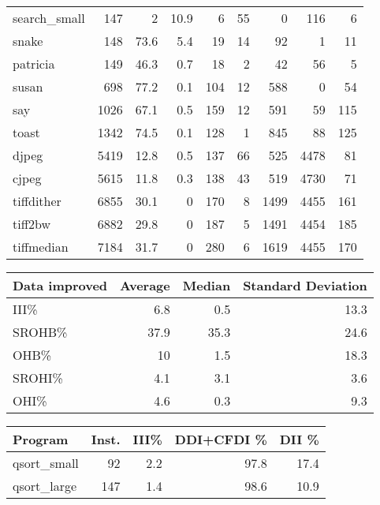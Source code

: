 \begin{tabular}{lrrrrrrrr}
 search\_small    &      147 &      2   &   10.9 &    6 &   55 &      0 &   116 &     6 \\
 snake           &      148 &     73.6 &    5.4 &   19 &   14 &     92 &     1 &    11 \\
 patricia        &      149 &     46.3 &    0.7 &   18 &    2 &     42 &    56 &     5 \\
 susan           &      698 &     77.2 &    0.1 &  104 &   12 &    588 &     0 &    54 \\
 say             &     1026 &     67.1 &    0.5 &  159 &   12 &    591 &    59 &   115 \\
 toast           &     1342 &     74.5 &    0.1 &  128 &    1 &    845 &    88 &   125 \\
 djpeg           &     5419 &     12.8 &    0.5 &  137 &   66 &    525 &  4478 &    81 \\
 cjpeg           &     5615 &     11.8 &    0.3 &  138 &   43 &    519 &  4730 &    71 \\
 tiffdither      &     6855 &     30.1 &    0   &  170 &    8 &   1499 &  4455 &   161 \\
 tiff2bw         &     6882 &     29.8 &    0   &  187 &    5 &   1491 &  4454 &   185 \\
 tiffmedian      &     7184 &     31.7 &    0   &  280 &    6 &   1619 &  4455 &   170 \\
\hline
\end{tabular}\begin{tabular}{lrrr}
\hline
 Data improved   &   Average &   Median &   Standard Deviation \\
\hline
 III\%            &       6.8 &      0.5 &                 13.3 \\
 SROHB\%          &      37.9 &     35.3 &                 24.6 \\
 OHB\%            &      10   &      1.5 &                 18.3 \\
 SROHI\%          &       4.1 &      3.1 &                  3.6 \\
 OHI\%            &       4.6 &      0.3 &                  9.3 \\
\hline
\end{tabular}\begin{tabular}{lrrrr}
\hline
 Program         &   Inst. &   III\% &   DDI+CFDI \% &   DII \% \\
\hline
 qsort\_small     &      92 &    2.2 &         97.8 &    17.4 \\
 qsort\_large     &     147 &    1.4 &         98.6 &    10.9 \\

\end{tabular}
